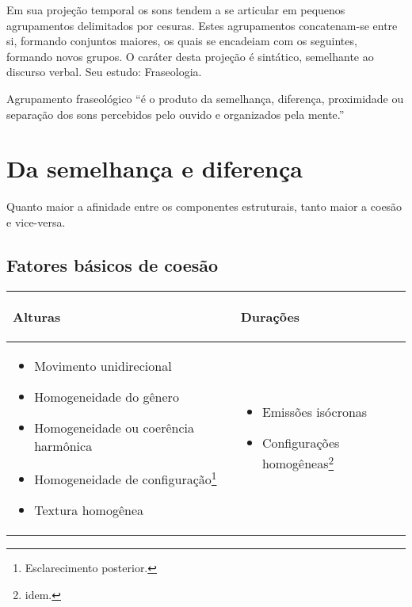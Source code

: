 \documentclass[a4paper]{book}
\begin{document}
Em sua projeção temporal os sons tendem a se articular em pequenos agrupamentos delimitados por cesuras. Estes agrupamentos concatenam-se entre si, formando conjuntos maiores, os quais se encadeiam com os seguintes, formando novos grupos. O caráter desta projeção é sintático, semelhante ao discurso verbal. Seu estudo: Fraseologia.

Agrupamento fraseológico ``é o produto da semelhança, diferença, proximidade ou separação dos sons percebidos pelo ouvido e organizados pela mente.''\cite{cooper1960rhythmic}

\chapter{Da semelhança e diferença}

Quanto maior a afinidade entre os componentes estruturais, tanto maior a coesão e vice-versa.

\section{Fatores básicos de coesão}

\noindent
\begin{savenotes}
\begin{center}
\begin{tabular}{|p{6.5cm}|p{4.7cm}|}
\hline

\begin{center}
\textbf{Alturas} 
\end{center}

& 

\begin{center}
\textbf{Durações} 
\end{center}

\\ 

\hline

\begin{itemize}[leftmargin=0.3cm]
\item Movimento unidirecional
\item Homogeneidade do gênero 
\item Homogeneidade ou coerência harmônica
\item Homogeneidade de configuração\footnote{Esclarecimento posterior.}
\item Textura homogênea
\end{itemize}

&

\begin{itemize}[leftmargin=0.3cm]
\item Emissões isócronas 
\item Configurações homogêneas\footnote{idem.}
\end{itemize}

\\ 
\hline
\end{tabular} 
\end{center}
\end{savenotes}
\end{document}

